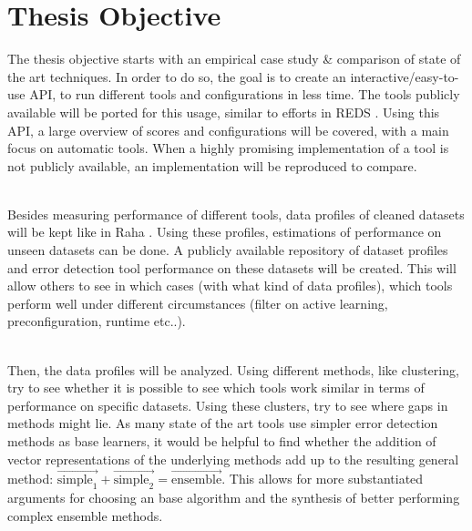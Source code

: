 \section{Thesis Objective}

%
%
%
%
% 
% 
% 
% 

The thesis objective starts with an empirical case study \& comparison of state of the art techniques. In order to do so, the goal is to create an interactive/easy-to-use API, to run different tools and configurations in less time. The tools publicly available will be ported for this usage, similar to efforts in REDS \cite{Mahdavi2019-pk}. Using this API, a large overview of scores and configurations will be covered, with a main focus on automatic tools. When a highly promising implementation of a tool is not publicly available, an implementation will be reproduced to compare.

~\\Besides measuring performance of different tools, data profiles of cleaned datasets will be kept like in Raha \cite{Mahdavi2019-zf}. Using these profiles, estimations of performance on unseen datasets can be done. A publicly available repository of dataset profiles and error detection tool performance on these datasets will be created. This will allow others to see in which cases (with what kind of data profiles), which tools perform well under different circumstances (filter on active learning, preconfiguration, runtime etc..).

~\\Then, the data profiles will be analyzed. Using different methods, like clustering, try to see whether it is possible to see which tools work similar in terms of performance on specific datasets. Using these clusters, try to see where gaps in methods might lie. As many state of the art tools use simpler error detection methods as base learners, it would be helpful to find whether the addition of vector representations of the underlying methods add up to the resulting general method: $\overrightarrow{\text{simple}_1} + \overrightarrow{\text{simple}_2} = \overrightarrow{\text{ensemble}}$. This allows for more substantiated arguments for choosing an base algorithm and the synthesis of better performing complex ensemble methods.

